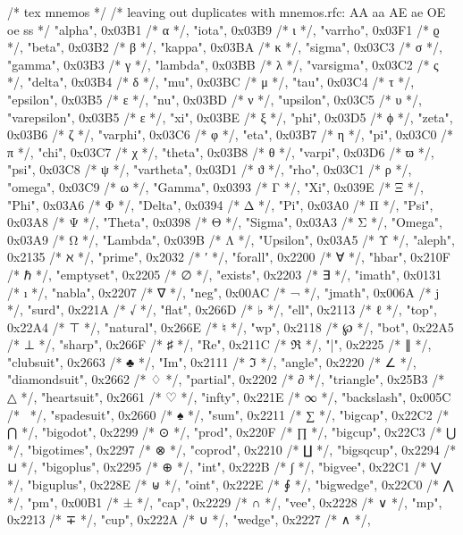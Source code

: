 	/* tex mnemos */
	/* leaving out duplicates with mnemos.rfc: AA aa AE ae OE oe ss  */
	{"alpha", 0x03B1 /* α */},
	{"iota", 0x03B9 /* ι */},
	{"varrho", 0x03F1 /* ϱ */},
	{"beta", 0x03B2 /* β */},
	{"kappa", 0x03BA /* κ */},
	{"sigma", 0x03C3 /* σ */},
	{"gamma", 0x03B3 /* γ */},
	{"lambda", 0x03BB /* λ */},
	{"varsigma", 0x03C2 /* ς */},
	{"delta", 0x03B4 /* δ */},
	{"mu", 0x03BC /* μ */},
	{"tau", 0x03C4 /* τ */},
	{"epsilon", 0x03B5 /* ε */},
	{"nu", 0x03BD /* ν */},
	{"upsilon", 0x03C5 /* υ */},
	{"varepsilon", 0x03B5 /* ε */},
	{"xi", 0x03BE /* ξ */},
	{"phi", 0x03D5 /* ϕ */},
	{"zeta", 0x03B6 /* ζ */},
	{"varphi", 0x03C6 /* φ */},
	{"eta", 0x03B7 /* η */},
	{"pi", 0x03C0 /* π */},
	{"chi", 0x03C7 /* χ */},
	{"theta", 0x03B8 /* θ */},
	{"varpi", 0x03D6 /* ϖ */},
	{"psi", 0x03C8 /* ψ */},
	{"vartheta", 0x03D1 /* ϑ */},
	{"rho", 0x03C1 /* ρ */},
	{"omega", 0x03C9 /* ω */},
	{"Gamma", 0x0393 /* Γ */},
	{"Xi", 0x039E /* Ξ */},
	{"Phi", 0x03A6 /* Φ */},
	{"Delta", 0x0394 /* Δ */},
	{"Pi", 0x03A0 /* Π */},
	{"Psi", 0x03A8 /* Ψ */},
	{"Theta", 0x0398 /* Θ */},
	{"Sigma", 0x03A3 /* Σ */},
	{"Omega", 0x03A9 /* Ω */},
	{"Lambda", 0x039B /* Λ */},
	{"Upsilon", 0x03A5 /* Υ */},
	{"aleph", 0x2135 /* ℵ */},
	{"prime", 0x2032 /* ′ */},
	{"forall", 0x2200 /* ∀ */},
	{"hbar", 0x210F /* ℏ */},
	{"emptyset", 0x2205 /* ∅ */},
	{"exists", 0x2203 /* ∃ */},
	{"imath", 0x0131 /* ı */},
	{"nabla", 0x2207 /* ∇ */},
	{"neg", 0x00AC /* ¬ */},
	{"jmath", 0x006A /* j */},
	{"surd", 0x221A /* √ */},
	{"flat", 0x266D /* ♭ */},
	{"ell", 0x2113 /* ℓ */},
	{"top", 0x22A4 /* ⊤ */},
	{"natural", 0x266E /* ♮ */},
	{"wp", 0x2118 /* ℘ */},
	{"bot", 0x22A5 /* ⊥ */},
	{"sharp", 0x266F /* ♯ */},
	{"Re", 0x211C /* ℜ */},
	{"|", 0x2225 /* ∥ */},
	{"clubsuit", 0x2663 /* ♣ */},
	{"Im", 0x2111 /* ℑ */},
	{"angle", 0x2220 /* ∠ */},
	{"diamondsuit", 0x2662 /* ♢ */},
	{"partial", 0x2202 /* ∂ */},
	{"triangle", 0x25B3 /* △ */},
	{"heartsuit", 0x2661 /* ♡ */},
	{"infty", 0x221E /* ∞ */},
	{"backslash", 0x005C /* \ */},
	{"spadesuit", 0x2660 /* ♠ */},
	{"sum", 0x2211 /* ∑ */},
	{"bigcap", 0x22C2 /* ⋂ */},
	{"bigodot", 0x2299 /* ⊙ */},
	{"prod", 0x220F /* ∏ */},
	{"bigcup", 0x22C3 /* ⋃ */},
	{"bigotimes", 0x2297 /* ⊗ */},
	{"coprod", 0x2210 /* ∐ */},
	{"bigsqcup", 0x2294 /* ⊔ */},
	{"bigoplus", 0x2295 /* ⊕ */},
	{"int", 0x222B /* ∫ */},
	{"bigvee", 0x22C1 /* ⋁ */},
	{"biguplus", 0x228E /* ⊎ */},
	{"oint", 0x222E /* ∮ */},
	{"bigwedge", 0x22C0 /* ⋀ */},
	{"pm", 0x00B1 /* ± */},
	{"cap", 0x2229 /* ∩ */},
	{"vee", 0x2228 /* ∨ */},
	{"mp", 0x2213 /* ∓ */},
	{"cup", 0x222A /* ∪ */},
	{"wedge", 0x2227 /* ∧ */},
